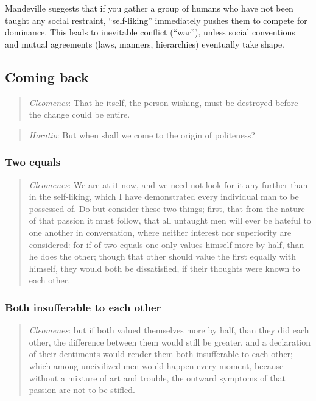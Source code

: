             Mandeville suggests that if you gather a group of humans who have not been taught any social restraint, “self-liking” immediately pushes them to compete for dominance. This leads to inevitable conflict (“war”), unless social conventions and mutual agreements (laws, manners, hierarchies) eventually take shape.

    \subsection{Coming back}

            \begin{quote}
                \textit{Cleomenes}: That he itself, the person wishing, must be destroyed before the change could be entire.
            \end{quote}

            \begin{quote}
                \textit{Horatio}: But when shall we come to the origin of politeness?
            \end{quote}

        \subsubsection{Two equals}

            \begin{quote}
                \textit{Cleomenes}: We are at it now, and we need not look for it any further than in the self-liking, which I have demonstrated every individual man to be possessed of. Do but consider these two things; first, that from the nature of that passion it must follow, that all untaught men will ever be hateful to one another in conversation, where neither interest nor superiority are considered: for if of two equals one only values himself more by half, than he does the other; though that other should value the first equally with himself, they would both be dissatisfied, if their thoughts were known to each other.
            \end{quote}
 
        \subsubsection{Both insufferable to each other}

            \begin{quote}
                \textit{Cleomenes}: but if both valued themselves more by half, than they did each other, the difference between them would still be greater, and a declaration of their dentiments would render them both insufferable to each other; which among uncivilized men would happen every moment, because without a mixture of art and trouble, the outward symptoms of that passion are not to be stifled.
            \end{quote}

